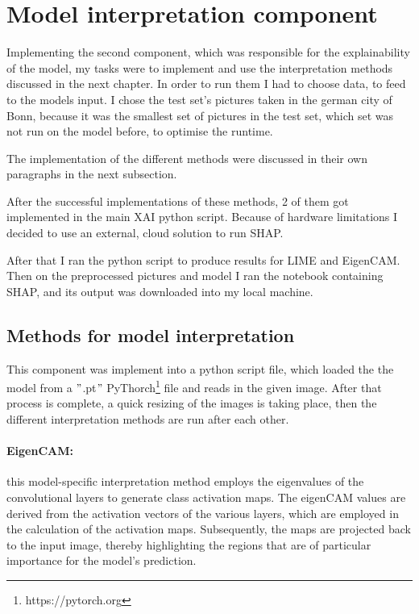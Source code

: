 


\section{Model interpretation component}\label{sec:model-interpretation2}
Implementing the second component, which was responsible for the explainability of the model, my tasks were to implement and use the interpretation methods discussed in the next chapter.
In order to run them I had to choose data, to feed to the models input.
I chose the test set's pictures taken in the german city of Bonn,
because it was the smallest set of pictures in the test set, which set was not run on the model before, to optimise the runtime.

The implementation of the different methods were discussed in their own paragraphs in the next subsection.

After the successful implementations of these methods, 2 of them got implemented in the main XAI python script. Because of hardware limitations I decided to use an external, cloud solution to run SHAP.

After that I ran the python script to produce results for LIME and EigenCAM. Then on the preprocessed pictures and model I ran the notebook containing SHAP, and its output was downloaded into my local machine.

\subsection{Methods for model interpretation}\label{subsec:methods-for-model-interpretation}

This component was implement into a python script file, which loaded the the model from a \("\).pt\("\) PyThorch\footnote{https://pytorch.org} file and reads in the given image.
After that process is complete, a quick resizing of the images is taking place, then the different interpretation methods are run after each other.

\paragraph{EigenCAM:}\label{par:eigencam}
this model-specific interpretation method employs the eigenvalues of the convolutional layers to generate class activation maps.
The eigenCAM values are derived from the activation vectors of the various layers, which are employed in the calculation of the activation maps.
Subsequently, the maps are projected back to the input image, thereby highlighting the regions that are of particular importance for the model's prediction.

